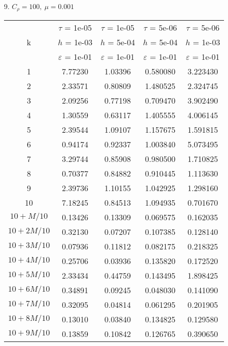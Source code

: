 9. $C_{\rho} = 100, \ \mu = 0.001$
\begin{center}
	\begin{tabular}{ |c|c|c|c|c| } 
		\hline
		& $\tau$ = 1e-05 & $\tau$ = 1e-05 & $\tau$ = 5e-06 & $\tau$ = 5e-06 \\ 
		k & $h$ = 1e-03 & $h$ = 5e-04 & $h$ = 5e-04 & $h$ = 1e-03 \\ 
		& $\varepsilon$ = 1e-01 & $\varepsilon$ = 1e-01 & $\varepsilon$ = 1e-01 & $\varepsilon$ = 1e-01 \\ 
		\hline
		1 & 7.77230 & 1.03396 & 0.580080 & 3.223430 \\
		\hline
		2 & 2.33571 & 0.80809 & 1.480525 & 2.324745 \\
		\hline
		3 & 2.09256 & 0.77198 & 0.709470 & 3.902490 \\
		\hline
		4 & 1.30559 & 0.63117 & 1.405555 & 4.006145 \\
		\hline
		5 & 2.39544 & 1.09107 & 1.157675 & 1.591815 \\
		\hline
		6 & 0.94174 & 0.92337 & 1.003840 & 5.073495 \\
		\hline
		7 & 3.29744 & 0.85908 & 0.980500 & 1.710825 \\
		\hline
		8 & 0.70377 & 0.84882 & 0.910445 & 1.113630 \\
		\hline
		9 & 2.39736 & 1.10155 & 1.042925 & 1.298160 \\
		\hline
		10 & 7.18245 & 0.84513 & 1.094935 & 0.701670 \\
		\hline
		$10 + M/10$ & 0.13426 & 0.13309 & 0.069575 & 0.162035 \\
		\hline
		$10 + 2M/10$ & 0.32130 & 0.07207 & 0.107385 & 0.128140 \\
		\hline
		$10 + 3M/10$ & 0.07936 & 0.11812 & 0.082175 & 0.218325 \\
		\hline
		$10 + 4M/10$ & 0.25706 & 0.03936 & 0.135820 & 0.172520 \\
		\hline
		$10 + 5M/10$ & 2.33434 & 0.44759 & 0.143495 & 1.898425 \\
		\hline
		$10 + 6M/10$ & 0.34891 & 0.09245 & 0.048030 & 0.141090 \\
		\hline
		$10 + 7M/10$ & 0.32095 & 0.04814 & 0.061295 & 0.201905 \\
		\hline
		$10 + 8M/10$ & 0.13010 & 0.03840 & 0.134825 & 0.129580 \\
		\hline
		$10 + 9M/10$ & 0.13859 & 0.10842 & 0.126765 & 0.390650 \\
		\hline
	\end{tabular}
\end{center}

